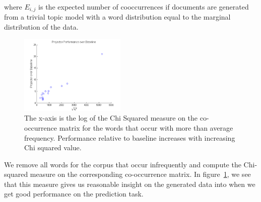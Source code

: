 where $E_{i,j}$ is the expected number of cooccurrences if
documents are generated from a trivial topic model with
a word distribution equal to the marginal distribution
of the data. 


\begin{figure}
     \begin{center}
            \includegraphics[width=0.45\textwidth]{x2.png}

    \end{center}
    \caption{The x-axis is the log of the Chi Squared measure on the co-occurrence matrix for the words that occur with more than average frequency. Performance relative to baseline increases with increasing Chi squared value.}
   \label{fig:x2}
\end{figure}


We remove all words for the corpus that occur infrequently and
compute the Chi-squared measure on the corresponding co-occurrence
matrix.  In figure~\ref{fig:x2}, we see that this measure 
gives us reasonable insight on the generated data
into when we get good performance on the prediction
task. 


